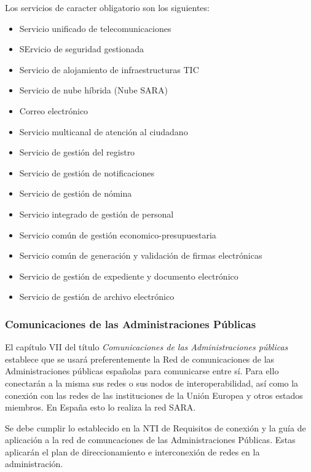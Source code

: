         Los servicios de caracter obligatorio son los siguientes:
        \begin{itemize}
            \item Servicio unificado de telecomunicaciones
            \item SErvicio de seguridad gestionada
            \item Servicio de alojamiento de infraestructuras TIC
            \item Servicio de nube híbrida (Nube SARA)
            \item Correo electrónico
            \item Servicio multicanal de atención al ciudadano
            \item Servicio de gestión del registro
            \item Servicio de gestión de notificaciones
            \item Servicio de gestión de nómina
            \item Servicio integrado de gestión de personal
            \item Servicio común de gestión economico-presupuestaria
            \item Servicio común de generación y validación de firmas electrónicas
            \item Servicio de gestión de expediente y documento electrónico
            \item Servicio de gestión de archivo electrónico
        \end{itemize}

    \subsubsection{Comunicaciones de las Administraciones Públicas} %
        El capítulo VII del título \textit{Comunicaciones de las Administraciones públicas} establece que se usará preferentemente la Red de comunicaciones de las Administraciones públicas españolas para comunicarse entre sí. Para ello conectarán a la misma sus redes o sus nodos de interoperabilidad, así como la conexión con las redes de las instituciones de la Unión Europea y otros estados miembros. En España esto lo realiza la red SARA.

        Se debe cumplir lo establecido en la NTI de Requisitos de conexión y la guía de aplicación a la red de comuncaciones de las Administraciones Públicas. Estas aplicarán el plan de direccionamiento e interconexión de redes en la administración.

